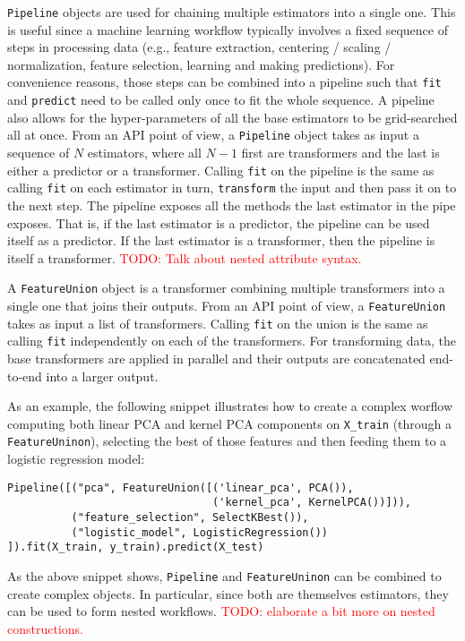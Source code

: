 \documentclass{llncs}
\begin{document}
\texttt{Pipeline} objects are used for chaining multiple estimators into a
single one. This is useful since a machine learning workflow typically involves
a fixed sequence of steps in processing data (e.g., feature extraction,
centering / scaling / normalization, feature selection, learning and making
predictions). For convenience reasons, those steps can be combined into a
pipeline such that \texttt{fit} and \texttt{predict} need to be called only once
to fit the whole sequence. A pipeline also allows for the hyper-parameters of
all the base estimators to be grid-searched all at once. From an API point of
view, a \texttt{Pipeline} object takes as input a sequence of $N$ estimators,
where all $N-1$ first are transformers and the last is either a predictor or a
transformer. Calling \texttt{fit} on the pipeline is the same as calling
\texttt{fit} on each estimator in turn, \texttt{transform} the input and then
pass it on to the next step. The pipeline exposes all the methods the last
estimator in the pipe exposes. That is, if the last estimator is a predictor,
the pipeline can be used itself as a predictor. If the last estimator is a
transformer, then the pipeline is itself a transformer. \textcolor{red}{TODO:
Talk about nested attribute syntax.}

A \texttt{FeatureUnion} object is a transformer combining multiple transformers
into a single one that joins their outputs. From an API point of view, a
\texttt{FeatureUnion} takes as input a list of transformers. Calling
\texttt{fit} on the union is the same as calling \texttt{fit} independently on
each of the transformers. For transforming data, the base transformers are
applied in parallel and their outputs are concatenated end-to-end into a larger
output.

As an example, the following snippet illustrates how to create a complex worflow
computing both linear PCA and kernel PCA components on \texttt{X\_train} (through a
\texttt{FeatureUninon}), selecting the best of those features and then feeding
them to a logistic regression model:
\begin{verbatim}
Pipeline([("pca", FeatureUnion([('linear_pca', PCA()),
                                ('kernel_pca', KernelPCA())])),
          ("feature_selection", SelectKBest()),
          ("logistic_model", LogisticRegression())
]).fit(X_train, y_train).predict(X_test)
\end{verbatim}

As the above snippet shows, \texttt{Pipeline} and \texttt{FeatureUninon} can be
combined to create complex objects. In particular, since both are themselves
estimators, they can be used to form nested workflows. \textcolor{red}{TODO:
elaborate a bit more on nested constructions.}
\end{document}
